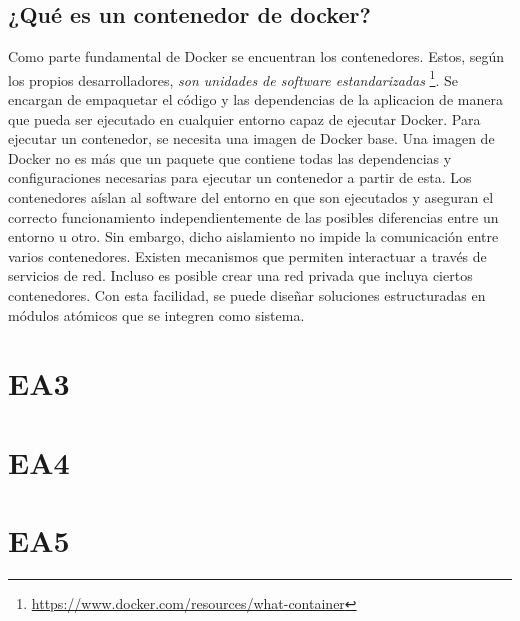 \subsection{¿Qué es un contenedor de docker?}

Como parte fundamental de Docker se encuentran los contenedores. Estos, según los propios
desarrolladores, \textit{son unidades de software estandarizadas} \footnote{
\url{https://www.docker.com/resources/what-container}}. Se encargan de empaquetar
el código y las dependencias de la aplicacion de manera que pueda ser ejecutado en cualquier 
entorno capaz de ejecutar Docker. Para ejecutar un contenedor, se necesita una imagen de Docker 
base. Una imagen de Docker no es más que un paquete que contiene todas las dependencias y 
configuraciones necesarias para ejecutar un contenedor a partir de esta. Los contenedores aíslan
al software del entorno en que son ejecutados y aseguran el correcto funcionamiento 
independientemente de las posibles diferencias entre un entorno u otro. Sin embargo, dicho
aislamiento no impide la comunicación entre varios contenedores. Existen mecanismos que permiten
interactuar a través de servicios de red. Incluso es posible crear una red privada que incluya
ciertos contenedores. Con esta facilidad, se puede diseñar soluciones estructuradas en módulos
atómicos que se integren como sistema.




\section{EA3}
\section{EA4}
\section{EA5}
